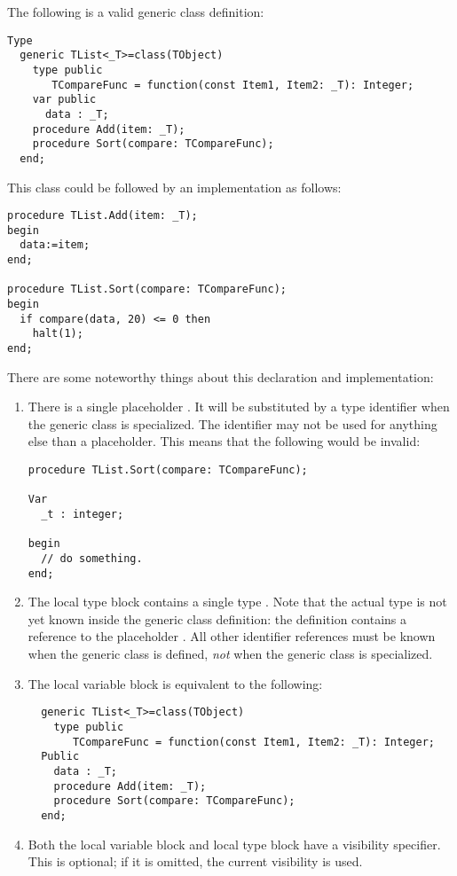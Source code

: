The following is a valid generic class definition:
\begin{verbatim}
Type
  generic TList<_T>=class(TObject)
    type public
       TCompareFunc = function(const Item1, Item2: _T): Integer;
    var public
      data : _T;
    procedure Add(item: _T);
    procedure Sort(compare: TCompareFunc);
  end;
\end{verbatim}
This class could be followed by an implementation as follows:
\begin{verbatim}
procedure TList.Add(item: _T);
begin
  data:=item;
end;

procedure TList.Sort(compare: TCompareFunc);
begin
  if compare(data, 20) <= 0 then
    halt(1);
end;
\end{verbatim}
There are some noteworthy things about this declaration and implementation:
\begin{enumerate}
\item There is a single placeholder . It will be substituted by a
type identifier when the generic class is specialized. The identifier
 may not be used for anything else than a placeholder. This means
that the following would be invalid:
\begin{verbatim}
procedure TList.Sort(compare: TCompareFunc);

Var
  _t : integer;

begin
  // do something.
end;
\end{verbatim}
\item The local type block contains a single type . Note
that the actual type is not yet known inside the generic class definition:
the definition contains a reference to the placeholder . All other
identifier references must be known when the generic class is defined, {\em not}
when the generic class is specialized.
\item The local variable block is equivalent to the following:
\begin{verbatim}
  generic TList<_T>=class(TObject)
    type public
       TCompareFunc = function(const Item1, Item2: _T): Integer;
  Public  
    data : _T;
    procedure Add(item: _T);
    procedure Sort(compare: TCompareFunc);
  end;
\end{verbatim}
\item Both the local variable block and local type block have a visibility
specifier. This is optional; if it is omitted, the current visibility is
used.
\end{enumerate}

